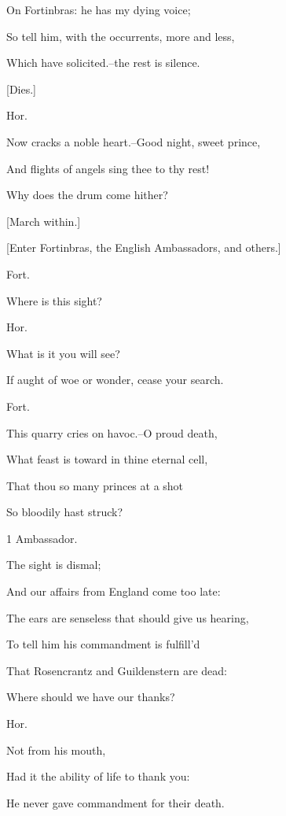 \documentclass[12pt]{book}
\begin{document}
On Fortinbras: he has my dying voice;

So tell him, with the occurrents, more and less,

Which have solicited.--the rest is silence.



[Dies.]



Hor.

Now cracks a noble heart.--Good night, sweet prince,

And flights of angels sing thee to thy rest!

Why does the drum come hither?



[March within.]



[Enter Fortinbras, the English Ambassadors, and others.]



Fort.

Where is this sight?



Hor.

What is it you will see?

If aught of woe or wonder, cease your search.



Fort.

This quarry cries on havoc.--O proud death,

What feast is toward in thine eternal cell,

That thou so many princes at a shot

So bloodily hast struck?



1 Ambassador.

The sight is dismal;

And our affairs from England come too late:

The ears are senseless that should give us hearing,

To tell him his commandment is fulfill'd

That Rosencrantz and Guildenstern are dead:

Where should we have our thanks?



Hor.

Not from his mouth,

Had it the ability of life to thank you:

He never gave commandment for their death.
\end{document}

